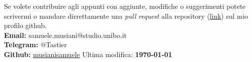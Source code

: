 Se volete contribuire agli appunti con aggiunte, modifiche o suggerimenti potete scrivermi o mandare dirrettamente una \textit{pull request} alla repository (\href{https://github.com/musianisamuele/Analisi}{link}) sul mio profilo github.\\


\textbf{Email:} samuele.musiani@studio.unibo.it\\

\textbf{Telegram:} @Tastier\\

\textbf{Github:} \href{https://github.com/musianisamuele}{musianisamuele}
\hfill Ultima modifica: \textbf{\today}
